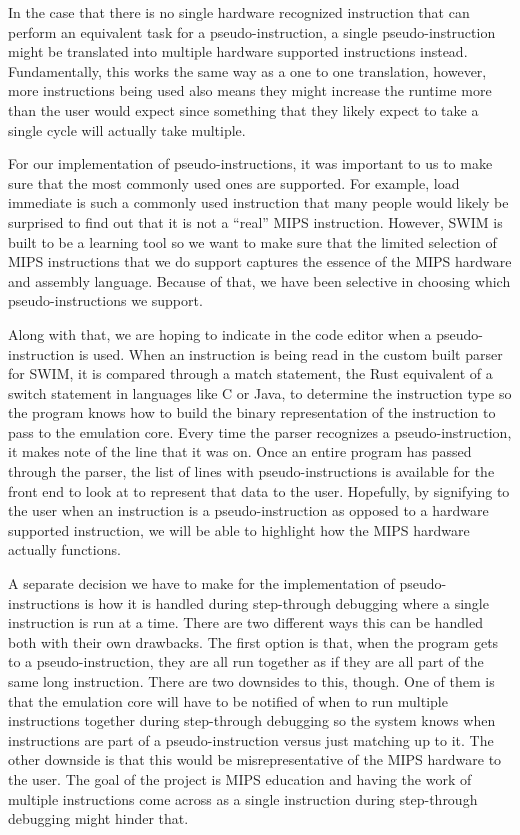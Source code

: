 \documentclass[
    parskip=half,
    fontsize=12pt,
    titlepage=firstiscover,
    toc=bibliography,
    numbers=endperiod
]{scrartcl}
\begin{document}
In the case that there is no single hardware recognized instruction that
can perform an equivalent task for a pseudo-instruction, a single
pseudo-instruction might be translated into multiple hardware supported
instructions instead. Fundamentally, this works the same way as a one to
one translation, however, more instructions being used also means they
might increase the runtime more than the user would expect since
something that they likely expect to take a single cycle will actually
take multiple.

For our implementation of pseudo-instructions, it was important to us to
make sure that the most commonly used ones are supported. For example,
load immediate is such a commonly used instruction that many people
would likely be surprised to find out that it is not a ``real'' MIPS
instruction. However, SWIM is built to be a learning tool so we want to
make sure that the limited selection of MIPS instructions that we do
support captures the essence of the MIPS hardware and assembly language.
Because of that, we have been selective in choosing which
pseudo-instructions we support.

Along with that, we are hoping to indicate in the code editor when a
pseudo-instruction is used. When an instruction is being read in the
custom built parser for SWIM, it is compared through a match statement,
the Rust equivalent of a switch statement in languages like C or Java,
to determine the instruction type so the program knows how to build the
binary representation of the instruction to pass to the emulation core.
Every time the parser recognizes a pseudo-instruction, it makes note of
the line that it was on. Once an entire program has passed through the
parser, the list of lines with pseudo-instructions is available for the
front end to look at to represent that data to the user. Hopefully, by
signifying to the user when an instruction is a pseudo-instruction as
opposed to a hardware supported instruction, we will be able to
highlight how the MIPS hardware actually functions.

A separate decision we have to make for the implementation of
pseudo-instructions is how it is handled during step-through debugging
where a single instruction is run at a time. There are two different
ways this can be handled both with their own drawbacks. The first option
is that, when the program gets to a pseudo-instruction, they are all run
together as if they are all part of the same long instruction. There are
two downsides to this, though. One of them is that the emulation core
will have to be notified of when to run multiple instructions together
during step-through debugging so the system knows when instructions are
part of a pseudo-instruction versus just matching up to it. The other
downside is that this would be misrepresentative of the MIPS hardware to
the user. The goal of the project is MIPS education and having the work
of multiple instructions come across as a single instruction during
step-through debugging might hinder that.
\end{document}
